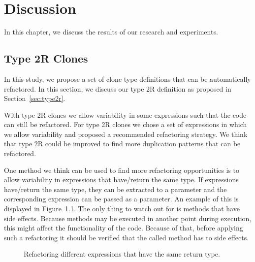 \chapter{Discussion} \label{ch:discussion}
In this chapter, we discuss the results of our research and experiments.

\section{Type 2R Clones}
In this study, we propose a set of clone type definitions that can be automatically refactored. In this section, we discuss our type 2R definition as proposed in Section~\ref{sec:type2r}.

With type 2R clones we allow variability in some expressions such that the code can still be refactored. For type 2R clones we chose a set of expressions in which we allow variability and proposed a recommended refactoring strategy. We think that type 2R could be improved to find more duplication patterns that can be refactored.

One method we think can be used to find more refactoring opportunities is to allow variability in expressions that have/return the same type. If expressions have/return the same type, they can be extracted to a parameter and the corresponding expression can be passed as a parameter. An example of this is displayed in Figure~\ref{fig:samereturn}. The only thing to watch out for is methods that have side effects. Because methods may be executed in another point during execution, this might affect the functionality of the code. Because of that, before applying such a refactoring it should be verified that the called method has to side effects.

\begin{figure}[H]
\begin{parcolumns}{2}
\end{parcolumns}
\caption{Refactoring different expressions that have the same return type.}
\label{fig:samereturn}
\end{figure}

